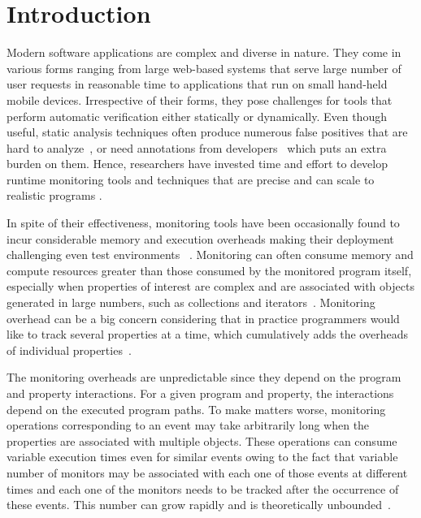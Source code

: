 \section{Introduction}
\label{sec:introduction}

Modern software applications are complex and diverse in nature. They come in 
various forms ranging from large web-based systems that serve large number of 
user requests in reasonable time to applications that run on small hand-held 
mobile devices. Irrespective of their forms, they pose challenges for tools that 
perform automatic verification either statically or dynamically. Even though 
useful, static analysis techniques often produce numerous false positives 
that are hard to analyze~\cite{Deline04,Naeem:ECOOP08}, or need
annotations from developers~\cite{Bierhoff:ECOOP09, Bierhoff:OOPSLA07} which puts
an extra burden on them. Hence, researchers have invested time and 
effort to develop runtime monitoring tools and techniques that are precise
and can scale to realistic programs \cite{Allan:OOPSLA05, Arnold:OOPSLA08, chen2005, Reger2015}.

In spite of their effectiveness, monitoring tools have been occasionally found 
to incur considerable memory and execution overheads making their deployment 
challenging even
test environments ~\cite{Purandare:2013}.
Monitoring can often consume memory and compute resources 
greater than those 
consumed by the monitored program itself,
especially when properties of interest are complex and are associated with objects 
generated in large numbers, such as collections and iterators~\cite{chen2009}. 
Monitoring overhead can be a big concern considering that in practice 
programmers would like to track several properties at a time, which cumulatively 
adds the overheads of individual properties~\cite{luo-2014, Purandare:2013}.

The monitoring overheads are unpredictable since they depend on the program and 
property interactions. For a given program and property, the interactions depend 
on the executed program paths. To make matters worse, 
monitoring operations corresponding to an event may take arbitrarily long when 
the properties are associated with multiple objects.
These operations can consume variable 
execution times even for similar events owing to the fact that variable number 
of monitors may be associated with each one of those events at different times
and each one of the 
monitors needs to be tracked after the occurrence of these events. This number 
can grow rapidly and is theoretically unbounded~\cite{Purandare:2013}.

